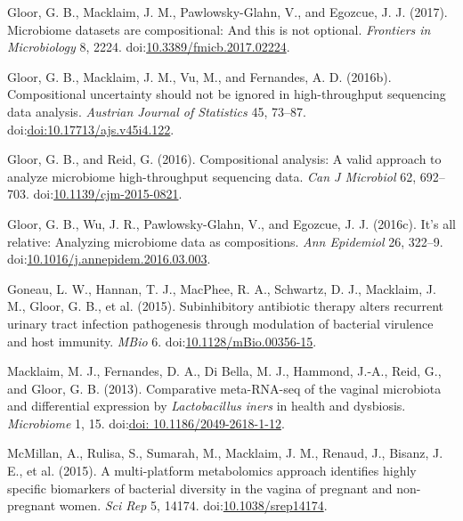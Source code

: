 \documentclass[twocolumn]{article}
\begin{document}
\leavevmode\hypertarget{ref-gloorFrontiers:2017}{}%
Gloor, G. B., Macklaim, J. M., Pawlowsky-Glahn, V., and Egozcue, J. J.
(2017). Microbiome datasets are compositional: And this is not optional.
\emph{Frontiers in Microbiology} 8, 2224.
doi:\href{https://doi.org/10.3389/fmicb.2017.02224}{10.3389/fmicb.2017.02224}.

\leavevmode\hypertarget{ref-gloorAJS:2016}{}%
Gloor, G. B., Macklaim, J. M., Vu, M., and Fernandes, A. D. (2016b).
Compositional uncertainty should not be ignored in high-throughput
sequencing data analysis. \emph{Austrian Journal of Statistics} 45,
73--87.
doi:\href{https://doi.org/doi:10.17713/ajs.v45i4.122}{doi:10.17713/ajs.v45i4.122}.

\leavevmode\hypertarget{ref-Gloor:2016cjm}{}%
Gloor, G. B., and Reid, G. (2016). Compositional analysis: A valid
approach to analyze microbiome high-throughput sequencing data.
\emph{Can J Microbiol} 62, 692--703.
doi:\href{https://doi.org/10.1139/cjm-2015-0821}{10.1139/cjm-2015-0821}.

\leavevmode\hypertarget{ref-gloor2016s}{}%
Gloor, G. B., Wu, J. R., Pawlowsky-Glahn, V., and Egozcue, J. J.
(2016c). It's all relative: Analyzing microbiome data as compositions.
\emph{Ann Epidemiol} 26, 322--9.
doi:\href{https://doi.org/10.1016/j.annepidem.2016.03.003}{10.1016/j.annepidem.2016.03.003}.

\leavevmode\hypertarget{ref-Goneau:2015ab}{}%
Goneau, L. W., Hannan, T. J., MacPhee, R. A., Schwartz, D. J., Macklaim,
J. M., Gloor, G. B., et al. (2015). Subinhibitory antibiotic therapy
alters recurrent urinary tract infection pathogenesis through modulation
of bacterial virulence and host immunity. \emph{MBio} 6.
doi:\href{https://doi.org/10.1128/mBio.00356-15}{10.1128/mBio.00356-15}.

\leavevmode\hypertarget{ref-macklaim:2013}{}%
Macklaim, M. J., Fernandes, D. A., Di Bella, M. J., Hammond, J.-A.,
Reid, G., and Gloor, G. B. (2013). Comparative meta-RNA-seq of the
vaginal microbiota and differential expression by \emph{Lactobacillus
iners} in health and dysbiosis. \emph{Microbiome} 1, 15.
doi:\href{https://doi.org/doi:\%2010.1186/2049-2618-1-12}{doi: 10.1186/2049-2618-1-12}.

\leavevmode\hypertarget{ref-McMillan:2015aa}{}%
McMillan, A., Rulisa, S., Sumarah, M., Macklaim, J. M., Renaud, J.,
Bisanz, J. E., et al. (2015). A multi-platform metabolomics approach
identifies highly specific biomarkers of bacterial diversity in the
vagina of pregnant and non-pregnant women. \emph{Sci Rep} 5, 14174.
doi:\href{https://doi.org/10.1038/srep14174}{10.1038/srep14174}.
\end{document}
